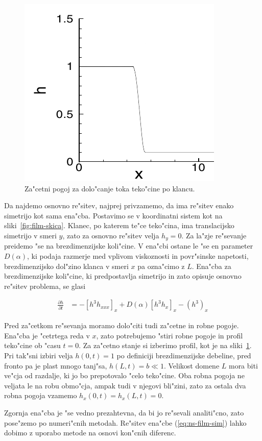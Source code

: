 \documentclass[a4paper,12pt]{article}
\newcommand{\odv}[1]{\frac{\partial #1}{\partial t}}
\begin{document}
\begin{figure}[h]
 \centering
 \includegraphics[width=.4\textwidth]{./Slike/film-zacetni}
 \caption{Za"cetni pogoj za dolo"canje toka teko"cine po klancu. }
 \label{fig:film-zacetni}
\end{figure}

Da najdemo osnovno re"sitev, najprej privzamemo, da ima re"sitev enako simetrijo kot sama ena"cba. Postavimo se v koordinatni sistem kot na sliki~\ref{fig:film-skica}. Klanec, po katerem te"ce teko"cina, ima translacijsko simetrijo v smeri $y$, zato za osnovno re"sitev velja $h_y = 0$. Za la"zje re"sevanje preidemo "se na brezdimenzijske koli"cine. V ena"cbi ostane le "se en parameter $D(\alpha)$, ki podaja razmerje med vplivom viskoznosti in povr"sinske napetosti, brezdimenzijsko dol"zino klanca v smeri $x$ pa ozna"cimo z $L$. Ena"cba za brezdimenzijske koli"cine, ki predpostavlja simetrijo in zato opisuje osnovno re"sitev problema, se glasi

\begin{align}
  \label{eq:ns-film-sim}
 \odv{h} &= - \left[h^3 h_{xxx}\right]_x + D(\alpha) \left[h^3 h_x\right]_x - \left(h^3\right)_x
\end{align}

Pred za"cetkom re"sevanja moramo dolo"citi tudi za"cetne in robne pogoje. Ena"cba je "cetrtega reda v $x$, zato potrebujemo "stiri robne pogoje in profil teko"cine ob "casu $t=0$. Za za"cetno stanje si izberimo profil, kot je na sliki~\ref{fig:film-zacetni}. Pri tak"sni izbiri velja $h(0, t) = 1$ po definiciji brezdimenzijske debeline, pred fronto pa je plast mnogo tanj"sa, $h(L, t) = b \ll 1$. Velikost domene $L$ mora biti ve"cja od razdalje, ki jo bo prepotovalo "celo teko"cine. Oba robna pogoja ne veljata le na robu obmo"cja, ampak tudi v njegovi bli"zini, zato za ostala dva robna pogoja vzamemo $h_x(0,t) = h_x(L,t) = 0$. 

Zgornja ena"cba je "se vedno prezahtevna, da bi jo re"sevali analiti"cno, zato pose"zemo po numeri"cnih metodah. Re"sitev ena"cbe (\ref{eq:ns-film-sim}) lahko dobimo z uporabo metode na osnovi kon"cnih diferenc. 
\end{document}
